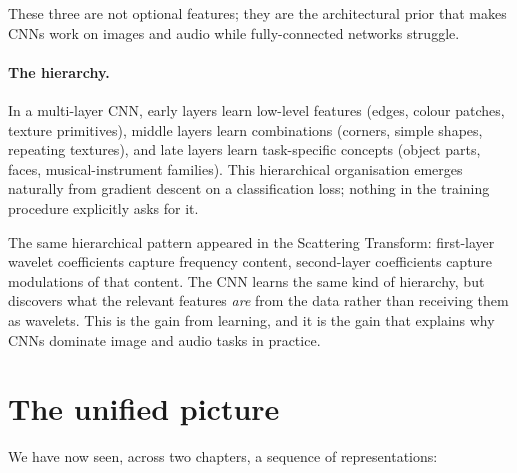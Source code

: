 These three are not optional features; they are the architectural prior
that makes CNNs work on images and audio while fully-connected networks
struggle.


\paragraph{The hierarchy.}  In a multi-layer CNN, early layers learn
low-level features (edges, colour patches, texture primitives), middle
layers learn combinations (corners, simple shapes, repeating textures),
and late layers learn task-specific concepts (object parts, faces,
musical-instrument families).  This hierarchical organisation emerges
naturally from gradient descent on a classification loss; nothing in
the training procedure explicitly asks for it.

The same hierarchical pattern appeared in the Scattering Transform:
first-layer wavelet coefficients capture frequency content, second-layer
coefficients capture modulations of that content.  The CNN learns the
same kind of hierarchy, but discovers what the relevant features
\emph{are} from the data rather than receiving them as wavelets.  This
is the gain from learning, and it is the gain that explains why CNNs
dominate image and audio tasks in practice.

\section{The unified picture}

We have now seen, across two chapters, a sequence of representations:

